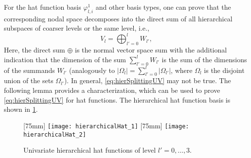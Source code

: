 %
For the hat function basis $\varphi_{l,i}^1$ and other basis types,
one can prove that the corresponding nodal space
decomposes into the direct sum of all
hierarchical subspaces of coarser levels or the same level, i.e.,
\begin{equation}
  \label{eq:hierSplittingUV}
  V_l
  = \bigoplus_{l'=0}^l W_{l'},
\end{equation}
Here, the direct sum $\oplus$ is
the normal vector space sum with the additional indication
that the dimension of the sum $\sum_{l'=0}^l W_{l'}$ is the sum
of the dimensions of the summands $W_{l'}$
(analogously to $|\Omega_l| = \sum_{l'=0}^l |\Omega_{l'}|$,
where $\Omega_l$ is the disjoint union of the sets $\Omega_{l'}$).
In general, \eqref{eq:hierSplittingUV} may not be true.
The following lemma provides a characterization,
which can be used to prove \eqref{eq:hierSplittingUV} for hat functions.
The hierarchical hat function basis is shown in \cref{fig:hierarchicalHat}.

\begin{figure}
  [75mm]{%
    \texttt{[image: hierarchicalHat\_1]}%
  }%
  \hfill%
  [75mm]{%
    \texttt{[image: hierarchicalHat\_2]}%
  }%
  \caption{Univariate hierarchical hat functions of level $l' = 0, \dotsc, 3$.}
  \label{fig:hierarchicalHat}
\end{figure}

